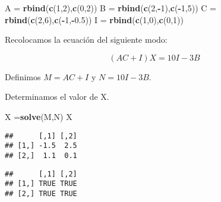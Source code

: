 \documentclass[
]{article}
\newenvironment{Shaded}{\begin{snugshade}}{\end{snugshade}}
\newcommand{\DecValTok}[1]{\textcolor[rgb]{0.00,0.00,0.81}{#1}}
\newcommand{\FloatTok}[1]{\textcolor[rgb]{0.00,0.00,0.81}{#1}}
\newcommand{\KeywordTok}[1]{\textcolor[rgb]{0.13,0.29,0.53}{\textbf{#1}}}
\newcommand{\NormalTok}[1]{#1}
\newcommand{\OperatorTok}[1]{\textcolor[rgb]{0.81,0.36,0.00}{\textbf{#1}}}
\newcommand{\StringTok}[1]{\textcolor[rgb]{0.31,0.60,0.02}{#1}}
\begin{document}
\begin{Shaded}
\begin{Highlighting}[]
\NormalTok{A =}\StringTok{ }\KeywordTok{rbind}\NormalTok{(}\KeywordTok{c}\NormalTok{(}\DecValTok{1}\NormalTok{,}\DecValTok{2}\NormalTok{),}\KeywordTok{c}\NormalTok{(}\DecValTok{0}\NormalTok{,}\DecValTok{2}\NormalTok{))}
\NormalTok{B =}\StringTok{ }\KeywordTok{rbind}\NormalTok{(}\KeywordTok{c}\NormalTok{(}\DecValTok{2}\NormalTok{,}\OperatorTok{-}\DecValTok{1}\NormalTok{),}\KeywordTok{c}\NormalTok{(}\OperatorTok{-}\DecValTok{1}\NormalTok{,}\DecValTok{5}\NormalTok{))}
\NormalTok{C =}\StringTok{ }\KeywordTok{rbind}\NormalTok{(}\KeywordTok{c}\NormalTok{(}\DecValTok{2}\NormalTok{,}\DecValTok{6}\NormalTok{),}\KeywordTok{c}\NormalTok{(}\OperatorTok{-}\DecValTok{1}\NormalTok{,}\OperatorTok{-}\FloatTok{0.5}\NormalTok{))}
\NormalTok{I =}\StringTok{ }\KeywordTok{rbind}\NormalTok{(}\KeywordTok{c}\NormalTok{(}\DecValTok{1}\NormalTok{,}\DecValTok{0}\NormalTok{),}\KeywordTok{c}\NormalTok{(}\DecValTok{0}\NormalTok{,}\DecValTok{1}\NormalTok{))}
\end{Highlighting}
\end{Shaded}

Recolocamos la ecuación del siguiente modo:

\[(AC+I)X=10I-3B\]

Definimos \(M=AC+I\) y \(N=10I-3B\).

\begin{Shaded}
\end{Shaded}

Determinamos el valor de X.

\begin{Shaded}
\begin{Highlighting}[]
\NormalTok{X =}\KeywordTok{solve}\NormalTok{(M,N)}
\NormalTok{X}
\end{Highlighting}
\end{Shaded}

\begin{verbatim}
##      [,1] [,2]
## [1,] -1.5  2.5
## [2,]  1.1  0.1
\end{verbatim}

\begin{Shaded}
\end{Shaded}

\begin{verbatim}
##      [,1] [,2]
## [1,] TRUE TRUE
## [2,] TRUE TRUE
\end{verbatim}
\end{document}

